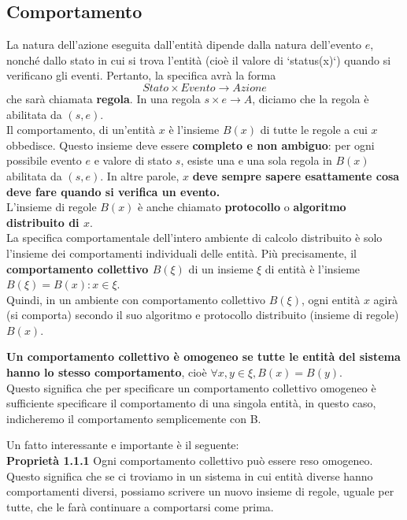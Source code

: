 \subsection*{Comportamento}
La natura dell'azione eseguita dall'entità dipende dalla natura dell'evento $e$, nonché dallo stato in cui si trova l'entità (cioè il valore di `status(x)`) quando si verificano gli eventi. Pertanto, la specifica avrà la forma
$$
Stato \times Evento \rightarrow Azione
$$
che sarà chiamata \textbf{regola}. In una regola $s \times e \rightarrow A$, diciamo che la regola è abilitata da $(s, e)$.\\
Il comportamento, di un'entità $x$ è l'insieme $B(x)$ di tutte le regole a cui $x$ obbedisce. Questo insieme deve essere \textbf{completo e non ambiguo}: per ogni possibile evento $e$ e valore di stato $s$, esiste una e una sola regola in $B(x)$ abilitata da $(s,e)$. In altre parole, $x$ \textbf{deve sempre sapere esattamente cosa deve fare quando si verifica un evento.}\\
L'insieme di regole $B(x)$ è anche chiamato \textbf{protocollo} o \textbf{algoritmo distribuito di $x$}.\\
La specifica comportamentale dell'intero ambiente di calcolo distribuito è solo l'insieme dei comportamenti individuali delle entità. Più precisamente, il \textbf{comportamento collettivo $B(\xi)$} di un insieme $\xi$ di entità è l'insieme $B(\xi) = {B(x): x \in \xi}$.\\
Quindi, in un ambiente con comportamento collettivo $B(\xi)$, ogni entità $x$ agirà (si comporta) secondo il suo algoritmo e protocollo distribuito (insieme di regole) $B(x)$.

\textbf{Un comportamento collettivo è omogeneo se tutte le entità del sistema hanno lo stesso comportamento}, cioè $\forall x, y \in \xi, B(x) = B(y)$.\\
Questo significa che per specificare un comportamento collettivo omogeneo è sufficiente specificare il comportamento di una singola entità, in questo caso, indicheremo il comportamento semplicemente con B. 

Un fatto interessante e importante è il seguente:\\
\textbf{Proprietà 1.1.1} Ogni comportamento collettivo può essere reso omogeneo.\\
Questo significa che se ci troviamo in un sistema in cui entità diverse hanno comportamenti diversi, possiamo scrivere un nuovo insieme di regole, uguale per tutte, che le farà continuare a comportarsi come prima.

